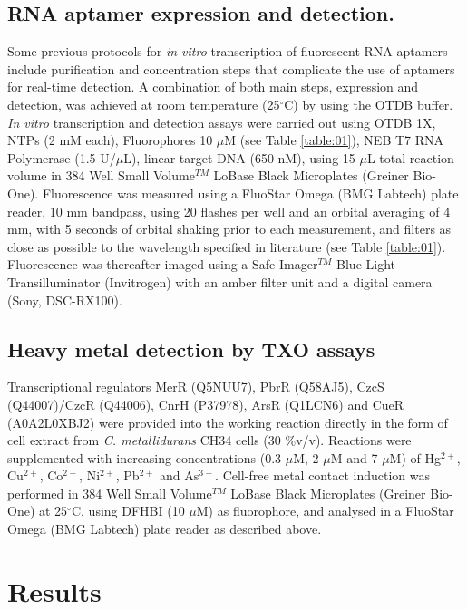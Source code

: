 \subsection*{RNA aptamer expression and detection.}

Some previous protocols for \textit{in vitro} transcription of fluorescent RNA aptamers \cite{12, 13} include purification and concentration steps that complicate the use of aptamers for real-time detection. A combination of both main steps, expression and detection, was achieved at room temperature (25$^{\circ}$C) by using the OTDB buffer.
\textit{In vitro} transcription and detection assays were carried out using OTDB 1X, NTPs (2 mM each), Fluorophores 10 $\mu$M (see Table \ref{table:01}), NEB T7 RNA Polymerase (1.5 U/$\mu$L), linear target DNA (650 nM), using 15 $\mu$L total reaction volume in 384 Well Small Volume$^{TM}$ LoBase Black Microplates (Greiner Bio-One). 
 Fluorescence was measured using a FluoStar Omega (BMG Labtech) plate reader, 10 mm bandpass, using 20 flashes per well and an orbital averaging of 4 mm, with 5 seconds of orbital shaking prior to each measurement, and filters as close as possible to the wavelength specified in literature (see Table \ref{table:01}). Fluorescence was thereafter imaged using a Safe Imager$^{TM}$ Blue-Light Transilluminator (Invitrogen) with an amber filter unit and a digital camera (Sony, DSC-RX100). 

\subsection*{Heavy metal detection by TXO assays}

Transcriptional regulators MerR (Q5NUU7), PbrR (Q58AJ5), CzcS (Q44007)/CzcR (Q44006), CnrH (P37978), ArsR (Q1LCN6) and CueR (A0A2L0XBJ2) were provided into the working reaction directly in the form of cell extract from \textit{C. metallidurans} CH34 cells (30 \%v/v). 
Reactions were supplemented with increasing concentrations (0.3 $\mu$M, 2 $\mu$M and 7 $\mu$M) of Hg$^{2+}$, Cu$^{2+}$, Co$^{2+}$, Ni$^{2+}$, Pb$^{2+}$ and As$^{3+}$. 
Cell-free metal contact induction was performed in 384 Well Small Volume$^{TM}$ LoBase Black Microplates (Greiner Bio-One) at 25$^{\circ}$C, using DFHBI (10 $\mu$M) as fluorophore, and analysed in a FluoStar Omega (BMG Labtech) plate reader as described above.


\section{\textbf{Results}}
